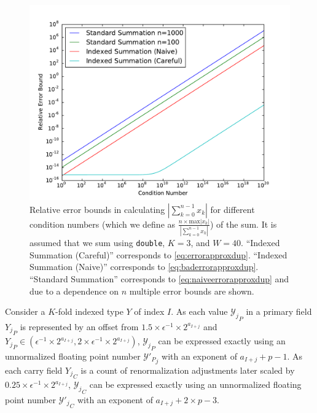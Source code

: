 \documentclass[12pt]{article}
\providecommand{\max}{\ensuremath{\text{max}}}
\theoremstyle{definition}
\numberwithin{equation}{section}
\numberwithin{figure}{section}
\begin{document}
\begin{figure}[H]
\begin{center}
\includegraphics[width=\textwidth]{plots/errorcomparison.pdf}
\caption{Relative error bounds in calculating $|\sum \limits_{k = 0}^{n - 1} x_k|$ for different condition numbers (which we define as $\frac{n \times \max |x_k|}{|\sum \limits_{k = 0}^{n - 1} x_k|}$) of the sum. It is assumed that we sum using \texttt{double}, $K = 3$, and $W = 40$. ``Indexed Summation (Careful)'' corresponds to \eqref{eq:errorapproxdup}. ``Indexed Summation (Naive)'' corresponds to \eqref{eq:baderrorapproxdup}. ``Standard Summation'' corresponds to \eqref{eq:naiveerrorapproxdup} and due to a dependence on $n$ multiple error bounds are shown.}
\label{fig:conversionmotivation}
\end{center}
\end{figure}

    Consider a $K$-fold indexed type $Y$ of index $I$.
    As each value ${\mathcal{Y}_j}_P$ in a primary field ${Y_j}_P$ is represented by an offset from $1.5 \times \epsilon^{-1} \times 2^{a_{I + j}}$ and ${Y_j}_P \in (\epsilon^{-1} \times 2^{a_{I + j}}, 2 \times \epsilon^{-1} \times 2^{a_{I + j}})$, ${\mathcal{Y}_j}_P$ can be expressed exactly using an unnormalized floating point number ${\mathcal{Y}'_P}_j$ with an exponent of $a_{I + j} + p - 1$.
    As each carry field ${Y_j}_C$ is a count of renormalization adjustments later scaled by $0.25 \times \epsilon^{-1} \times 2^{a_{I + j}}$, ${\mathcal{Y}_j}_C$ can be expressed exactly using an unnormalized floating point number ${\mathcal{Y}'_j}_C$ with an exponent of $a_{I + j} + 2 \times p - 3$.
\end{document}
